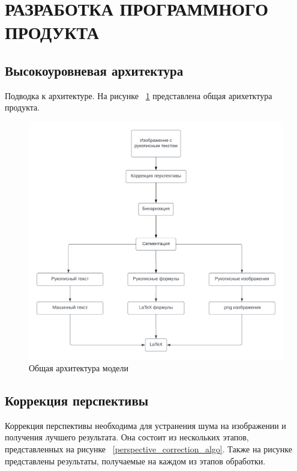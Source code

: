 \section{РАЗРАБОТКА ПРОГРАММНОГО ПРОДУКТА}

\subsection{Высокоуровневая архитектура}

Подводка к архитектуре.
На рисунке ~\ref{neuro_model} представлена общая арихетктура продукта.

\begin{figure}
\includegraphics[scale=0.75]{img/Blank_diagram.png}
\caption{Общая архитектура модели}
\label{neuro_model}
\end{figure}

\subsection{Коррекция перспективы}

Коррекция перспективы необходима для устранения шума на изображении и получения лучшего результата. Она состоит из нескольких этапов, представленных на рисунке ~\ref{perspective_correction_algo}. 
Также на рисунке представлены результаты, получаемые на каждом из этапов обработки.


